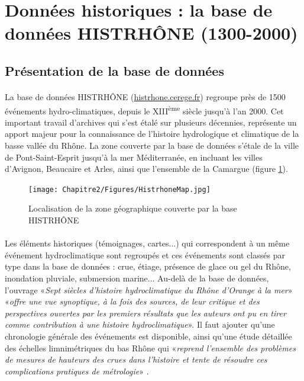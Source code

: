 \FloatBarrier

\section{Données historiques : la base de données HISTRHÔNE (1300-2000)}
\label{sec:HISTRHONE}
	\subsection{Présentation de la base de données}

	\paragraph{} La base de données HISTRHÔNE (\url{histrhone.cerege.fr}) \citep{pichard_sept_2014} regroupe près de 1500 événements hydro-climatiques, depuis le XIII\textsuperscript{ème} siècle jusqu'à l'an 2000. Cet important travail d'archives qui s'est étalé sur plusieurs décennies, représente un apport majeur pour la connaissance de l'histoire hydrologique et climatique de la basse vallée du Rhône. La zone couverte par la base de données s'étale de la ville de Pont-Saint-Esprit jusqu'à la mer Méditerranée, en incluant les villes d'Avignon, Beaucaire et Arles, ainsi que l'ensemble de la Camargue (figure \ref{fig:MapHistrhone}). 
	
	\begin{figure}[h]
	\centering
		\texttt{[image: Chapitre2/Figures/HistrhoneMap.jpg]}
        \caption{Localisation de la zone géographique couverte par la base HISTRHÔNE \citep{pichard_sept_2014} }
		\label{fig:MapHistrhone}
	\end{figure}
	
	\paragraph{} Les éléments historiques (témoignages, cartes...) qui correspondent à un même événement hydroclimatique sont regroupés et ces événements sont classés par type dans la base de données : crue, étiage, présence de glace ou gel du Rhône, inondation pluviale, submersion marine... Au-delà de la base de données, l'ouvrage «\textit{Sept siècles d'histoire hydroclimatique du Rhône d'Orange à la mer}» \citep{pichard_sept_2014} «\textit{offre une vue synoptique, à la fois des sources, de leur critique et des perspectives ouvertes par les premiers résultats que les auteurs ont pu en tirer comme contribution à une histoire hydroclimatique}». Il faut ajouter qu'une chronologie générale des événements est disponible, ainsi qu'une étude détaillée des échelles limnimétriques du bas Rhône qui «\textit{reprend l'ensemble des problèmes de mesures de hauteurs des crues dans l'histoire et tente de résoudre ces complications pratiques de métrologie}» \citep{pichard_hauteurs_2013} .
	
